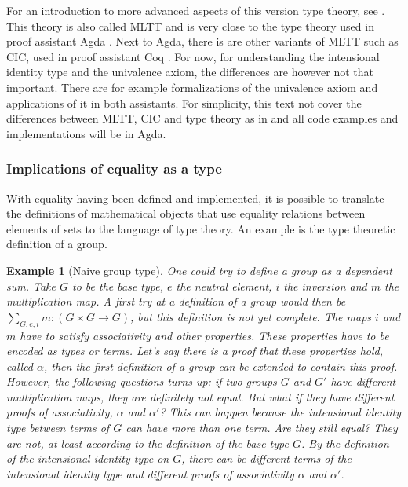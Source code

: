 \documentclass[12pt,a4paper,twoside,xetex]{book} %
\newtheorem{example}[theorem]{Example}
\begin{document}
For an introduction to more advanced aspects of this version type theory, see
\cite{Palmgren2014}. This theory is also called MLTT and is very close to the type theory used in proof assistant Agda \cite{Abel2019}. Next to Agda, there is are other variants of MLTT such as CIC, used in proof assistant Coq \cite{Arias2019}. For now, for understanding the intensional identity type and the univalence axiom, the differences are however not that 
important. There are for example formalizations of the univalence axiom and 
applications of it in both assistants. For simplicity, this text not cover the differences between MLTT,  CIC and type theory as in  and all code examples and implementations will be in Agda.


\subsubsection{Implications of equality as a type}\label{groupex}

With equality having been defined and implemented, it is possible to translate 
the definitions of mathematical objects that use equality relations between 
elements of sets to the language of type theory. An example is the type 
theoretic definition of a group. 

\begin{example}[Naive group type]\label{simplegroup}
One could try to define a group as a dependent 
sum. Take $G$ to be the base type, $e$ the neutral element, $i$ the inversion 
and $m$ the multiplication map. A first try at a definition of a group would 
then be $\sum_{G,e,i}m:(G\times G \rightarrow G)$, but this definition is not 
yet complete. The maps $i$ and $m$  have to satisfy associativity and other 
properties. These properties have to be encoded as types or terms. Let's say there is a proof that these properties hold, called $\alpha$, then the first definition of a group can be extended to contain this proof. However, the following questions turns up: if two groups $G$ and $G'$ have different multiplication 
maps, they are definitely not equal. But what if they have different proofs of 
associativity, $\alpha$ and $\alpha'$? This can happen because the intensional identity type
between terms of  $G$ can have more than one term. Are they still equal? They 
are not, at least according to the definition of the base type $G$. By the 
definition of the intensional identity type on $G$, there can be
different terms of the intensional identity type and different 
proofs of associativity $\alpha$ and $\alpha'$.
\end{example}
\end{document}
